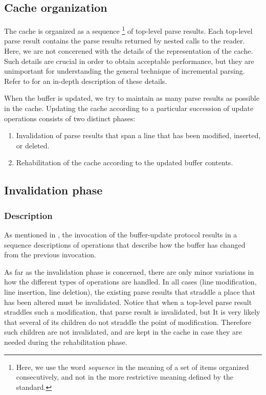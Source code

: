 \subsection{Cache organization}

The cache is organized as a sequence%
\footnote{Here, we use the word \emph{sequence} in the meaning of a
  set of items organized consecutively, and not in the more
  restrictive meaning defined by the \commonlisp{} standard.}  of
top-level parse results.  Each top-level parse result contains the
parse results returned by nested calls to the reader.  Here, we are
not concerened with the details of the representation of the cache.
Such details are crucial in order to obtain acceptable performance,
but they are unimportant for understanding the general technique of
incremental parsing.  Refer to  for an
in-depth description of these details.

When the buffer is updated, we try to maintain as many parse results
as possible in the cache.  Updating the cache according to a
particular succession of update operations consists of two distinct
phases:

\begin{enumerate}
\item Invalidation of parse results that span a line that has been
  modified, inserted, or deleted.
\item Rehabilitation of the cache according to the updated buffer
  contents.
\end{enumerate}

\subsection{Invalidation phase}

\subsubsection{Description}

As mentioned in , the invocation of
the buffer-update protocol results in a sequence descriptions of
operations that describe how the buffer has changed from the previous
invocation.

As far as the invalidation phase is concerned, there are only minor
variations in how the different types of operations are handled.  In
all cases (line modification, line insertion, line deletion), the
existing parse results that straddle a place that has been altered
must be invalidated.  Notice that when a top-level parse result
straddles such a modification, that parse result is invalidated, but
It is very likely that several of its children do not straddle the
point of modification.  Therefore such children are not invalidated,
and are kept in the cache in case they are needed during the
rehabilitation phase.


